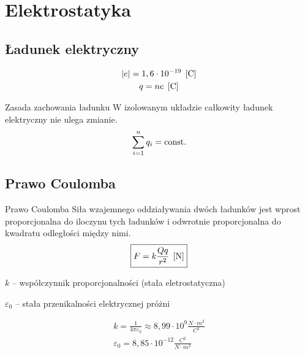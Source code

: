 \chapter{Elektrostatyka}
  \section{Ładunek elektryczny}
    \begin{gather*}
      |e| = 1,6\cdot 10^{-19} \;\left[\mathrm{C}\right]\\
      q = ne \;\left[\mathrm{C}\right]
    \end{gather*}
    \begin{law}{Zasada zachowania ładunku}
      W izolowanym układzie całkowity ładunek elektryczny nie ulega zmianie.
      \begin{equation}
        \sum_{i=1}^n q_i = \operatorname{const.}
      \end{equation}
    \end{law}

  \section{Prawo Coulomba}
    \begin{law}{Prawo Coulomba}
      Siła wzajemnego oddziaływania dwóch ładunków jest wprost proporcjonalna do iloczynu tych ładunków i odwrotnie proporcjonalna do kwadratu odległości między nimi.
      \begin{equation}\label{coulomb}
        \boxed{F = k\frac{Qq}{r^2} \;\left[\mathrm{N}\right]}
      \end{equation}
      \begin{symbols}
        \item $k$ -- współczynnik proporcjonalności (stała eletrostatyczna)
        \item $\varepsilon_0$ -- stała przenikalności elektrycznej próżni
      \end{symbols}
      \begin{gather*}
        k = \frac{1}{4\pi\varepsilon_0} \approx 8,99\cdot 10^9 \unit{\frac{N\cdot m^2}{C^2}}\\[0.5em]
        \varepsilon_0 = 8,85\cdot 10^{-12} \unit{\frac{C^2}{N\cdot m^2}}
      \end{gather*}
    \end{law}

